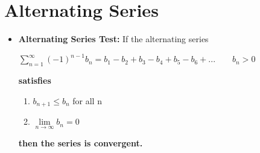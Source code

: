 \documentclass{report}
\begin{document}
	\section{Alternating Series}
		\begin{itemize}\addtolength{\leftskip}{2em}
			\item \textbf{Alternating Series Test: }If the alternating series
			\begin{center}
			$\sum\limits_{n=1}^{\infty}(-1)^{n-1}b_n=b_1-b_2+b_3-b_4+b_5-b_6+...\quad\quad b_n>0$ 
			\end{center}
			\begin{center}
			\textbf{satisfies}
			\end{center}
			\begin{enumerate}\addtolength{\leftskip}{17em}
			\item $b_{n+1}\le b_n$ for all n
			\item $\lim\limits_{n\rightarrow \infty}b_n=0$
			\end{enumerate}
			\begin{center}
			\textbf{then the series is convergent.}
			\end{center}
		\end{itemize}
\end{document}
